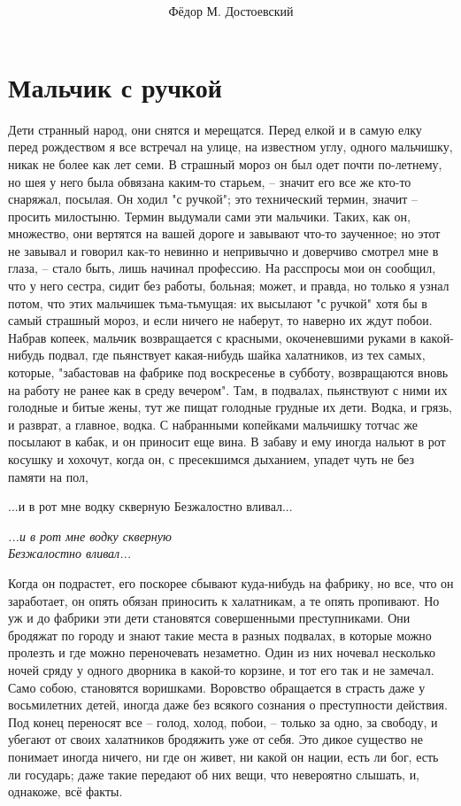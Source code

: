 \documentclass[a4paper, 10pt]{article}
\title{
	\Huge{\MyTitle}
}
\author{Фёдор М. Достоевский}
\date{}
\begin{document}
	\maketitle

    \section{Мальчик  с ручкой}
    
    Дети странный народ, они снятся и мерещатся. Перед елкой и в самую елку перед рождеством я все встречал на улице, на известном углу, одного мальчишку, никак не более как лет семи. В страшный мороз он был одет почти по-летнему, но шея у него была обвязана каким-то старьем, -- значит его все же кто-то снаряжал, посылая. Он ходил "с ручкой"; это технический термин, значит -- просить милостыню. Термин выдумали сами эти мальчики. Таких, как он, множество, они вертятся на вашей дороге и завывают что-то заученное; но этот не завывал и говорил как-то невинно и непривычно и доверчиво смотрел мне в глаза, -- стало быть, лишь начинал профессию. На расспросы мои он сообщил, что у него сестра, сидит без работы, больная; может, и правда, но только я узнал потом, что этих мальчишек тьма-тьмущая: их высылают "с ручкой" хотя бы в самый страшный мороз, и если ничего не наберут, то наверно их ждут побои. Набрав копеек, мальчик возвращается с красными, окоченевшими руками в какой-нибудь подвал, где пьянствует какая-нибудь шайка халатников, из тех самых, которые, "забастовав на фабрике под воскресенье в субботу, возвращаются вновь на работу не ранее как в среду вечером". Там, в подвалах, пьянствуют с ними их голодные и битые жены, тут же пищат голодные грудные их дети. Водка, и грязь, и разврат, а главное, водка. С набранными копейками мальчишку тотчас же посылают в кабак, и он приносит еще вина. В забаву и ему иногда нальют в рот косушку и хохочут, когда он, с пресекшимся дыханием, упадет чуть не без памяти на пол, 
    
    ...и в рот мне водку скверную 
    Безжалостно вливал... 

    \begin{center}\textit{
		...и в рот мне водку скверную \\
		Безжалостно вливал... }
	\end{center}
    
    Когда он подрастет, его поскорее сбывают куда-нибудь на фабрику, но все, что он заработает, он опять обязан приносить к халатникам, а те опять пропивают. Но уж и до фабрики эти дети становятся совершенными преступниками. Они бродяжат по городу и знают такие места в разных подвалах, в которые можно пролезть и где можно переночевать незаметно. Один из них ночевал несколько ночей сряду у одного дворника в какой-то корзине, и тот его так и не замечал. Само собою, становятся воришками. Воровство обращается в страсть даже у восьмилетних детей, иногда даже без всякого сознания о преступности действия. Под конец переносят все -- голод, холод, побои, -- только за одно, за свободу, и убегают от своих халатников бродяжить уже от себя. Это дикое существо не понимает иногда ничего, ни где он живет, ни какой он нации, есть ли бог, есть ли государь; даже такие передают об них вещи, что невероятно слышать, и, однакоже, всё факты. 
    
\end{document}
